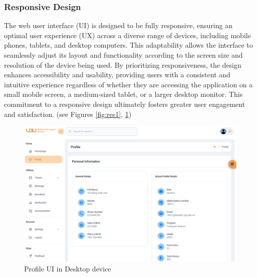 	
	\subsubsection{Responsive Design}
	The web user interface (UI) is designed to be fully responsive, ensuring an optimal user experience (UX) across a diverse range of devices, including mobile phones, tablets, and desktop computers. This adaptability allows the interface to seamlessly adjust its layout and functionality according to the screen size and resolution of the device being used. By prioritizing responsiveness, the design enhances accessibility and usability, providing users with a consistent and intuitive experience regardless of whether they are accessing the application on a small mobile screen, a medium-sized tablet, or a larger desktop monitor. This commitment to a responsive design ultimately fosters greater user engagement and satisfaction. (see Figures \ref{fig:res1}, \ref{fig:res2})
		
	\begin{figure}[H]
		\centering
		\includegraphics[width=1\linewidth]{graphics/responsive/res2}
		\caption{Profile UI in Desktop device}
		\label{fig:res2}
	\end{figure}
	
